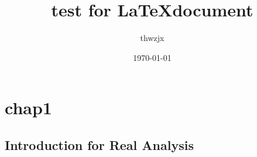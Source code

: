 \documentclass{article}
\title{test for \LaTeX document}
\author{thwzjx}
\date{\today}
\begin{document}
\maketitle
\tableofcontents
\section{chap1}
\subsection{Introduction for Real Analysis}
\end{document}
